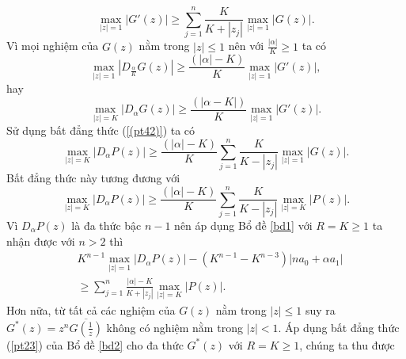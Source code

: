 \documentclass[a5paper,12pt]{report}
\theoremstyle{definition}
\def\geq{\geqslant}
\numberwithin{equation}{chapter}
\def\vt{\vert}
\def\vt{\vert}
\def\vt{\vert}
\begin{document}
	\begin{equation}\label{(pt42)}
		\max\limits_{\vt z\vt=1}|G'(z)| \ge \sum_{j=1}^n\frac{K}{K+|z_j|}\max\limits_{\vt z\vt=1}|G(z)|.
	\end{equation}
	Vì mọi nghiệm của $G(z)$  nằm trong $|z|\le 1$ nên với $\frac{|\alpha|}{K}\geq 1$ ta có
	$$\max\limits_{\vt z\vt=1}|D_\frac{\alpha}{K}G(z)|\ge \frac{(|\alpha|-K)}{K}\max\limits_{\vt z\vt=1}|G'(z)|,$$
	hay
	$$\max\limits_{\vt z\vt=K}|D_{\alpha}G(z)|\ge\frac{(|\alpha-K|)}{K}\max\limits_{\vt z\vt=1}|G'(z)|.
	$$
	Sử dụng bất đẳng thức (\ref{(pt42)}) ta có
	$$\max\limits_{\vt z\vt=K}|D_\alpha P(z)|\ge \frac{(|\alpha|-K)}{K}\sum_{j=1}^n\frac{K}{K-|z_j|}\max\limits_{\vt z\vt=1}|G(z)|.$$
	Bất đẳng thức   này tương đương với
	\begin{equation}\label{(pt43)}
		\max\limits_{\vt z\vt=K}|D_\alpha P(z)|\ge \frac{(|\alpha|-K)}{K}\sum_{j=1}^n\frac{K}{K-|z_j|}\max\limits_{\vt z\vt=K}|P(z)|.
	\end{equation}
	Vì  $D_\alpha P(z)$ là đa thức bậc $n-1$ nên áp dụng Bổ đề \ref{bd1}  với $R=K \ge 1$ ta nhận được với $n>2$ thì
	\begin{equation}\label{pt44}
		\begin{aligned}
			& K^{n-1}\max\limits_{\vt z\vt=1}|D_\alpha P(z)|-\left(K^{n-1}-K^{n-3}\right)|n a_0 +\alpha a_1| \\
			& \ge \sum_{j=1}^n \frac{|\alpha|-K}{K+|z_j|}\max\limits_{\vt z\vt=K}|P(z)|.
		\end{aligned}
	\end{equation}
	Hơn nữa, từ  tất cả các nghiệm của $G(z)$  nằm trong $|z|\le 1$ suy ra $G^*(z)=z^n\overline{G(\frac{1}{z})}$ không có nghiệm nằm trong $|z|< 1 $. Áp dụng bất đẳng thức (\ref{pt23}) của Bổ đề \ref{bd2} cho đa thức $G^*(z)$ với $R=K \ge 1$, chúng ta thu được
	
\end{document}

